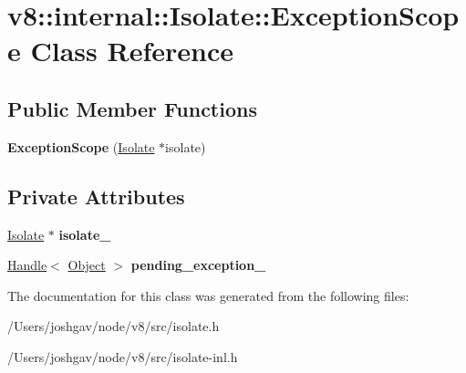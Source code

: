 \hypertarget{classv8_1_1internal_1_1_isolate_1_1_exception_scope}{}\section{v8\+:\+:internal\+:\+:Isolate\+:\+:Exception\+Scope Class Reference}
\label{classv8_1_1internal_1_1_isolate_1_1_exception_scope}
\subsection*{Public Member Functions}
\begin{DoxyCompactItemize}
\item 
{\bfseries Exception\+Scope} (\hyperlink{classv8_1_1internal_1_1_isolate}{Isolate} $\ast$isolate)\hypertarget{classv8_1_1internal_1_1_isolate_1_1_exception_scope_a513f450377f5c44b9aa2c271ad3e4b3a}{}\label{classv8_1_1internal_1_1_isolate_1_1_exception_scope_a513f450377f5c44b9aa2c271ad3e4b3a}

\end{DoxyCompactItemize}
\subsection*{Private Attributes}
\begin{DoxyCompactItemize}
\item 
\hyperlink{classv8_1_1internal_1_1_isolate}{Isolate} $\ast$ {\bfseries isolate\+\_\+}\hypertarget{classv8_1_1internal_1_1_isolate_1_1_exception_scope_adf8e19afd1579c55e75c80ec5cc5d578}{}\label{classv8_1_1internal_1_1_isolate_1_1_exception_scope_adf8e19afd1579c55e75c80ec5cc5d578}

\item 
\hyperlink{classv8_1_1internal_1_1_handle}{Handle}$<$ \hyperlink{classv8_1_1internal_1_1_object}{Object} $>$ {\bfseries pending\+\_\+exception\+\_\+}\hypertarget{classv8_1_1internal_1_1_isolate_1_1_exception_scope_a5496d1a71af5776521b12ab0f3a79da0}{}\label{classv8_1_1internal_1_1_isolate_1_1_exception_scope_a5496d1a71af5776521b12ab0f3a79da0}

\end{DoxyCompactItemize}


The documentation for this class was generated from the following files\+:\begin{DoxyCompactItemize}
\item 
/\+Users/joshgav/node/v8/src/isolate.\+h\item 
/\+Users/joshgav/node/v8/src/isolate-\/inl.\+h\end{DoxyCompactItemize}
